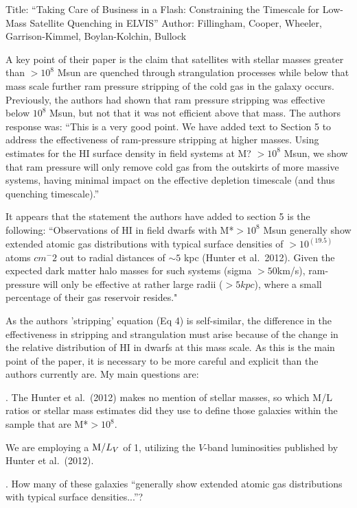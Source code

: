 \documentclass[11pt, preprint]{aastex}
\begin{document}
\noindent Title: ``Taking Care of Business in a Flash: Constraining the Timescale for Low-Mass Satellite Quenching in ELVIS'' Author: Fillingham, Cooper, Wheeler, Garrison-Kimmel, Boylan-Kolchin, Bullock

\noindent A key point of their paper is the claim that satellites with stellar masses greater than $>10^8$ Msun are quenched through strangulation processes while below that mass scale further ram pressure stripping of the cold gas in the galaxy occurs. Previously, the authors had shown that ram pressure stripping was effective below $10^8$ Msun, but not that it was not efficient above that mass. The authors response was: ``This is a very good point. We have added text to Section 5 to address the effectiveness of ram-pressure stripping at higher masses. Using estimates for the HI surface density in field systems at M? $>10^8$ Msun, we show that ram pressure will only remove cold gas from the outskirts of more massive systems, having minimal impact on the effective depletion timescale (and thus quenching timescale).''



\noindent It appears that the statement the authors have added to section 5 is the following: ``Observations of HI in field dwarfs with M*$>10^8$ Msun generally show extended atomic gas distributions with typical surface densities of $>10^(19.5)$ atoms $cm^-2$ out to radial distances of $\sim5$ kpc (Hunter et al.~2012). Given the expected dark matter halo masses for such systems (sigma $> 50$km/s), ram-pressure will only be effective at rather large radii ($>5 kpc$), where a small percentage of their gas reservoir resides."

\noindent As the authors 'stripping' equation (Eq 4) is self-similar, the difference in the effectiveness in stripping and strangulation must arise because of the change in the relative distribution of HI in dwarfs at this mass scale. As this is the main point of the paper, it is necessary to be more careful and explicit than the authors currently are. My main questions are:

. The Hunter et al.~(2012) makes no mention of stellar masses, so which M/L ratios or stellar mass estimates did they use to define those galaxies within the sample that are M*$>10^8$.

\indent \parbox{5.5in}{We are employing a ${\rm M}/L_{V}$ of 1, utilizing the $V$-band luminosities published by Hunter et al.~(2012).}

. How many of these galaxies ``generally show extended atomic gas distributions with typical surface densities...''?
\end{document}
